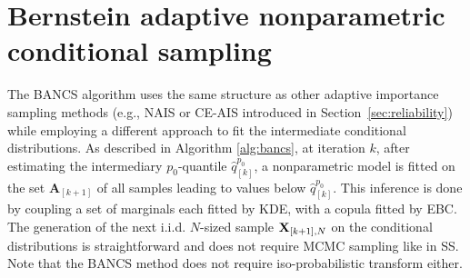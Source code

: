 \section{Bernstein adaptive nonparametric conditional sampling}\label{sec:bancs}


The BANCS algorithm uses the same structure as other adaptive importance sampling methods (e.g., NAIS or CE-AIS introduced in Section~\ref{sec:reliability}) while employing a different approach to fit the intermediate conditional distributions. 
As described in Algorithm \ref{alg:bancs}, at iteration $k$, after estimating the intermediary $p_0$-quantile $\widehat{q}_{[k]}^{p_0}$, a nonparametric model is fitted on the set $\mathbf{A}_{[k+1]}$ of all samples leading to values below $\widehat{q}_{[k]}^{p_0}$.  
This inference is done by coupling a set of marginals each fitted by KDE, with a copula fitted by EBC. 
The generation of the next i.i.d. $N$-sized sample ${\bf X}_{[k+1], N}$ on the conditional distributions is straightforward and does not require MCMC sampling like in SS. 
Note that the BANCS method does not require iso-probabilistic transform either.

